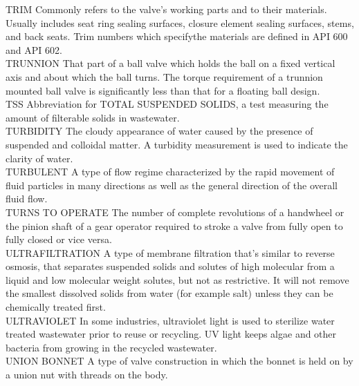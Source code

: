 \documentclass{article}
\begin{document}
TRIM
Commonly refers to the valve's working parts and to their materials. Usually includes seat ring sealing surfaces, closure element sealing surfaces, stems, and back seats. Trim numbers which specifythe materials are defined in API 600 and API 602.
\vspace{0.3cm}\\
TRUNNION
That part of a ball valve which holds the ball on a fixed vertical axis and about which the ball turns. The torque requirement of a trunnion mounted ball valve is significantly less than that for a floating ball design.
\vspace{0.3cm}\\
TSS
Abbreviation for TOTAL SUSPENDED SOLIDS, a test measuring the amount of filterable solids in wastewater.
\vspace{0.3cm}\\
TURBIDITY
The cloudy appearance of water caused by the presence of suspended and colloidal matter. A turbidity measurement is used to indicate the clarity of water.
\vspace{0.3cm}\\
TURBULENT
A type of flow regime characterized by the rapid movement of fluid particles in many directions as well as the general direction of the overall fluid flow.
\vspace{0.3cm}\\
TURNS TO OPERATE
The number of complete revolutions of a handwheel or the pinion shaft of a gear operator required to stroke a valve from fully open to fully closed or vice versa.
\vspace{0.3cm}\\
ULTRAFILTRATION
A type of membrane filtration that’s similar to reverse osmosis, that separates suspended solids and solutes of high molecular from a liquid and low molecular weight solutes, but not as restrictive. It will not remove the smallest dissolved solids from water (for example salt) unless they can be chemically treated first.
\vspace{0.3cm}\\
ULTRAVIOLET
In some industries, ultraviolet light is used to sterilize water treated wastewater prior to reuse or recycling. UV light keeps algae and other bacteria from growing in the recycled wastewater.
\vspace{0.3cm}\\
UNION BONNET
A type of valve construction in which the bonnet is held on by a union nut with threads on the body.
\vspace{0.3cm}\\
\end{document}
